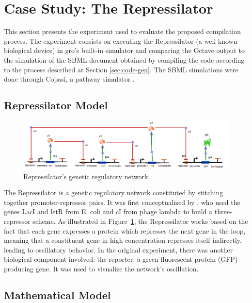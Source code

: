 \documentclass[12pt]{article}
\begin{document}
    


\section{Case Study: The Repressilator}


    This section presents the experiment used to evaluate the proposed compilation process. The experiment consists on executing the Repressilator (a well-known biological device) in gro's built-in simulator and comparing the Octave output to the simulation of the SBML document obtained by compiling the code according to the process described at Section \ref{sec:code-gen}. The SBML simulations were done through Copasi, a pathway simulator \cite{Hoops2006}.
    

\subsection{Repressilator Model}

    \begin{figure}[ht]
        \centering
        \includegraphics[scale = 0.45]{repressilator_model.png}
        \caption{Repressilator's genetic regulatory network.}
        \label{fig:repressilator_model}
    \end{figure}
    
    The Repressilator is a genetic regulatory network constituted by stitching together promoter-repressor pairs. It was first conceptualized by \cite{Elowitz2000}, who used the genes LacI and letR from E. coli and cI from phage lambda to build a three-repressor scheme. As illustrated in Figure~\ref{fig:repressilator_model}, the Repressilator works based on the fact that each gene expresses a protein which represses the next gene in the loop, meaning that a constituent gene in high concentration represses itself indirectly, leading to oscillatory behavior. In the original experiment, there was another biological component involved: the reporter, a green fluorescent protein (GFP) producing gene. It was used to visualize the network's oscillation.
    
\subsection{Mathematical Model}\label{math-model}
    
\end{document}
